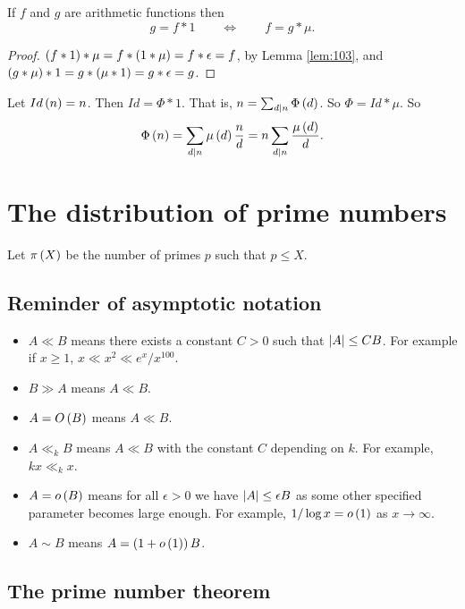\begin{proposition}
If $ f $ and $ g $ are arithmetic functions then
$$ g = f * 1 \qquad \iff \qquad f = g * \mu. $$
\end{proposition}

\begin{proof}
$ \left( f * 1 \right) * \mu = f * \left( 1 * \mu \right) = f * \epsilon = f $, by Lemma \ref{lem:103}, and $ \left( g * \mu \right) * 1 = g * \left( \mu * 1 \right) = g * \epsilon = g $.
\end{proof}

\begin{example*}
Let $ Id\left( n \right) = n $. Then $ Id = \Phi * 1 $. That is, $ n = \sum_{d \mid n} \Phi\left( d \right) $. So $ \Phi = Id * \mu $. So
$$ \Phi\left( n \right) = \sum_{d \mid n} \mu\left( d \right)\dfrac{n}{d} = n\sum_{d \mid n} \dfrac{\mu\left( d \right)}{d}. $$
\end{example*}

\pagebreak

\section{The distribution of prime numbers}

Let $ \pi\left( X \right) $ be the number of primes $ p $ such that $ p \le X $.

\subsection{Reminder of asymptotic notation}

\begin{itemize}
\item $ A \ll B $ means there exists a constant $ C > 0 $ such that $ \left\lvert A \right\rvert \le CB $. For example if $ x \ge 1 $, $ x \ll x^2 \ll e^x / x^{100} $.
\item $ B \gg A $ means $ A \ll B $.
\item $ A = O\left( B \right) $ means $ A \ll B $.
\item $ A \ll_k B $ means $ A \ll B $ with the constant $ C $ depending on $ k $. For example, $ kx \ll_k x $.
\item $ A = o\left( B \right) $ means for all $ \epsilon > 0 $ we have $ \left\lvert A \right\rvert \le \epsilon B $ as some other specified parameter becomes large enough. For example, $ 1 / \log x = o\left( 1 \right) $ as $ x \to \infty $.
\item $ A \sim B $ means $ A = \left( 1 + o\left( 1 \right) \right)B $.
\end{itemize}

\subsection{The prime number theorem}

